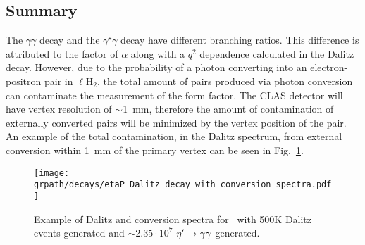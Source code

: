  \subsection{Summary}
 The $\gamma \gamma$ decay and the $\gamma^\star \gamma$ decay have different branching ratios. This difference is attributed to the factor of $\alpha$ along with a $q^2$ dependence calculated in the Dalitz decay. However, due to the probability of a photon converting into an electron-positron pair in $\ell$H$_2$, the total amount of \epemT pairs produced via photon conversion can contaminate the measurement of the form factor. The CLAS detector will have vertex resolution of $\sim$1~mm, therefore the amount of contamination of externally converted pairs will be minimized by the vertex position of the \epemT pair. An example of the total contamination, in the Dalitz spectrum, from external conversion within 1~mm of the primary vertex can be seen in Fig.~\ref{fig:dalitz_w_conversion}.
 \begin{figure}[h!]\begin{center}
 			\texttt{[image: \\grpath/decays/etaP\_Dalitz\_decay\_with\_conversion\_spectra.pdf]}
\caption[Dalitz and conversion spectra for \etaTP \ and $\phi$]{\label{fig:dalitz_w_conversion}Example of Dalitz and conversion spectra for \etaTP \ with 500K Dalitz events generated and $\sim 2.35 \cdot 10^7$ $\eta^{\prime} \to \gamma \gamma$ generated.}
\end{center}\end{figure}
\FloatBarrier
  
  
  